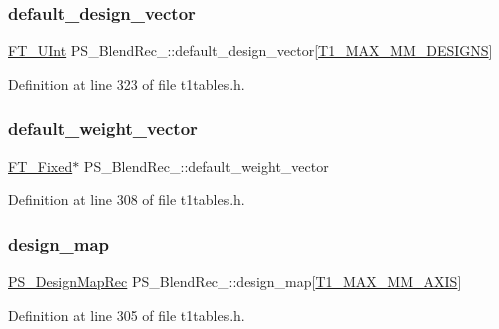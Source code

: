 \subsubsection{\texorpdfstring{default\_design\_vector}{default\_design\_vector}}
{\footnotesize\ttfamily \mbox{\hyperlink{fttypes_8h_abcb8db4dbf35d2b55a9e8c7b0926dc52}{F\+T\+\_\+\+U\+Int}} P\+S\+\_\+\+Blend\+Rec\+\_\+\+::default\+\_\+design\+\_\+vector\mbox{[}\mbox{\hyperlink{t1tables_8h_a933ca229674aa312fd5546fadc95e08f}{T1\+\_\+\+M\+A\+X\+\_\+\+M\+M\+\_\+\+D\+E\+S\+I\+G\+NS}}\mbox{]}}



Definition at line 323 of file t1tables.\+h.

\mbox{\label{struct_p_s___blend_rec___a29c19d988e8ee1eb4f333b1ac55759de}} 
\subsubsection{\texorpdfstring{default\_weight\_vector}{default\_weight\_vector}}
{\footnotesize\ttfamily \mbox{\hyperlink{fttypes_8h_a5f5a679cc09f758efdd0d1c5feed3c3d}{F\+T\+\_\+\+Fixed}}$\ast$ P\+S\+\_\+\+Blend\+Rec\+\_\+\+::default\+\_\+weight\+\_\+vector}



Definition at line 308 of file t1tables.\+h.

\mbox{\label{struct_p_s___blend_rec___a005c783c65e5dd35611e88901b5db2ca}} 
\subsubsection{\texorpdfstring{design\_map}{design\_map}}
{\footnotesize\ttfamily \mbox{\hyperlink{t1tables_8h_a94de6b0634fcae90953c7427cdb28eee}{P\+S\+\_\+\+Design\+Map\+Rec}} P\+S\+\_\+\+Blend\+Rec\+\_\+\+::design\+\_\+map\mbox{[}\mbox{\hyperlink{t1tables_8h_a471108ae668a65363dd36bb17e1ecbbe}{T1\+\_\+\+M\+A\+X\+\_\+\+M\+M\+\_\+\+A\+X\+IS}}\mbox{]}}



Definition at line 305 of file t1tables.\+h.

\mbox{\label{struct_p_s___blend_rec___ad0e6c9b9d42346fd8a3371a5b2473e3c}} 
